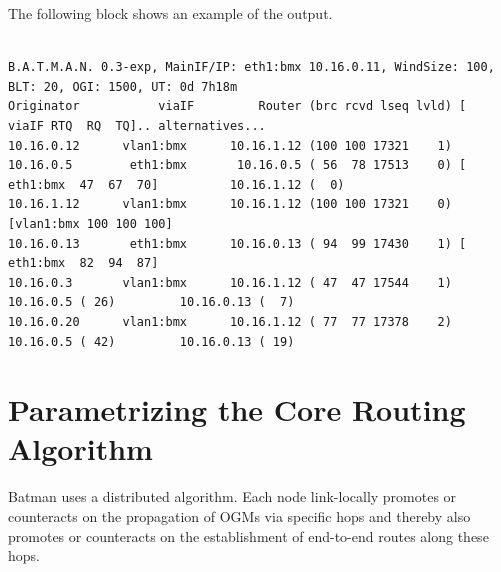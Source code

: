 \documentclass[11pt]{article}
\begin{document}
The following block shows an example of the output.

\begin{small}
\begin{verbatim}

B.A.T.M.A.N. 0.3-exp, MainIF/IP: eth1:bmx 10.16.0.11, WindSize: 100, BLT: 20, OGI: 1500, UT: 0d 7h18m 
Originator           viaIF         Router (brc rcvd lseq lvld) [    viaIF RTQ  RQ  TQ].. alternatives...
10.16.0.12      vlan1:bmx      10.16.1.12 (100 100 17321    1) 
10.16.0.5        eth1:bmx       10.16.0.5 ( 56  78 17513    0) [ eth1:bmx  47  67  70]          10.16.1.12 (  0) 
10.16.1.12      vlan1:bmx      10.16.1.12 (100 100 17321    0) [vlan1:bmx 100 100 100]  
10.16.0.13       eth1:bmx      10.16.0.13 ( 94  99 17430    1) [ eth1:bmx  82  94  87]  
10.16.0.3       vlan1:bmx      10.16.1.12 ( 47  47 17544    1)          10.16.0.5 ( 26)         10.16.0.13 (  7) 
10.16.0.20      vlan1:bmx      10.16.1.12 ( 77  77 17378    2)          10.16.0.5 ( 42)         10.16.0.13 ( 19) 

\end{verbatim}
\end{small}






\section{Parametrizing the Core Routing Algorithm}

Batman uses a distributed algorithm. Each node link-locally promotes or counteracts on the propagation of OGMs via specific hops and thereby also promotes or counteracts on the establishment of end-to-end routes along these hops.
\end{document}
